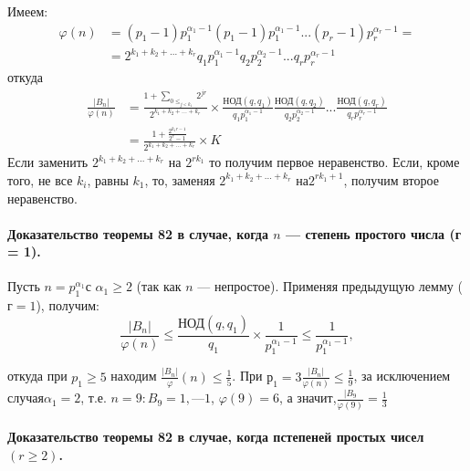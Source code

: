 \documentclass{mai_book}
\begin{document}
	\pagebreak
	\noindent
	\begin{myproof}
		Имеем:
		\begin{equation}
		\begin{split}
		\varphi(n) & = (p_1-1)p_{1}^{\alpha_1-1}(p_1-1)p_{1}^{\alpha_1-1}... (p_r-1)p_{r}^{\alpha_r-1} = \\ & = 2^{k_1+k_2+...+k_r}q_1p_{1}^{\alpha_1-1}q_2p_{2}^{\alpha_2-1}...q_rp_{r}^{\alpha_r-1} 
		\end{split}
		\end{equation}
		откуда
		\begin{equation}
		\begin{split}
		\frac{|B_n|}{\varphi(n)} & = \frac{1+ \sum_{0\leqslant_{j <k_1}} 2^{jr}}{2^{k_1+k_2+...+k_r}} \times \frac{\text{НОД}(q,q_1)}{q_1p_{1}^{\alpha_1-1}}\frac{\text{НОД}(q,q_2)}{q_2p_{2}^{\alpha_2-1}}...\frac{\text{НОД}(q,q_r)}{q_rp_{r}^{\alpha_r-1}} \\ & = \frac{1+\frac{2^{k_1r-1}}{2^r-1}}{2^{k_1+k_2+...+k_r}} \times K		
		\end{split}
		\end{equation}
		Если заменить $2^{k_1+k_2+...+k_r}$ на $2^{rk_1}$ то получим первое неравенство.
		Если, кроме того, не все $k_i$, равны $k_1$, то, заменяя $2^{k_1+k_2+...+k_r}$ на$2^{rk_1+1}$, получим второе неравенство.		
	\end{myproof}	

	\paragraph{Доказательство теоремы 82 в случае, когда $n$ — степень простого числа (г = 1).}
	
	
	Пусть $n = p_{1}^{\alpha_1}$с $\alpha_1 \geqslant 2$ (так как $n$ — непростое). Применяя предыдущую лемму ($г = 1$), получим:
	\begin{equation}
	\frac{|B_n|}{\varphi(n)} \leqslant \frac{\text{НОД}(q,q_1)}{q_1} \times \frac{1}{p_{1}^{\alpha_1-1}} \leqslant \frac{1}{p_{1}^{\alpha_1-1}},
	\end{equation}

	откуда при $p_1\geqslant 5$ находим $\frac{|B_n|}{\varphi}(n) \leqslant \frac{1}{5}$. При $р_1= 3 \frac{|B_n|}{\varphi(n)} \leqslant \frac{1}{9}$, за ис­ключением случая$\alpha_1= 2$, т.е. $n = 9: B_9	= {1, — 1}$, $\varphi(9) = 6$, а значит,$\frac{|B_9}{\varphi(9)} = \frac{1}{3}$
	
	\paragraph{Доказательство теоремы 82 в случае, когда пстепеней простых чисел $(r \geqslant 2)$.}
	
\end{document}

